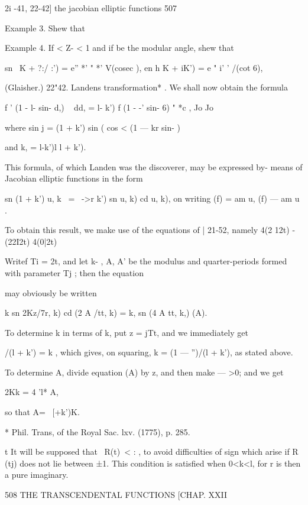 2i -41, 22-42] the jacobian elliptic functions 507 

Example 3. Shew that 

Example 4. If < Z- < 1 and if   be the modular angle, shew that 

sn \  K + ?:/ :') = e'' *' " *'  V(cosec  ), en h  K + iK') = e " i' '  /(cot 6), 

(Glaisher.) 
22"42. Landens transformation* . 
We shall now obtain the formula 

f ' (1 -  l- sin- d,) ~ dd, =  l-  k') f (1 -  -'  sin- 6) " *c , 
Jo Jo 

where sin  j = (1 + k') sin (  cos <  (1 — kr sin-  ) ~   

and k, =  l-k')l l + k'). 

This formula, of which Landen was the discoverer, may be expressed by- 
means of Jacobian elliptic functions in the form 

sn  (1 + k') u, k \ =  \ ->r k') sn  u, k) cd  u, k), 
on writing (f) = am u, (f)  — am u  . 

To obtain this result, we make use of the equations of | 21-52, namely 
 4(2 12t) -  (22I2t)  4(0|2t) 

Writef Ti = 2t, and let k- , A, A' be the modulus and quarter-periods 
formed with parameter Tj ; then the equation 


may obviously be written 

k sn  2Kz/7r, k) cd (2 A /tt, k) = k,  sn (4 A  tt, k,) (A). 

To determine k  in terms of k, put z = jTt, and we immediately get 

  /(l + k') = k , 
which gives, on squaring, k  = (1 —  '')/(l + k'), as stated above. 

To determine A, divide equation (A) by z, and then make  — >0; and 
we get 

2Kk = 4 'l* A, 

so that A=~ [+k')K. 

* Phil. Trans, of the Royal Sac. lxv. (1775), p. 285. 

t It will be supposed that \ R(t)\ < : , to avoid difficulties of sign which arise if R (tj) does 
not lie between ±1. This condition is satisfied when 0<k<l, for r is then a pure imaginary. 



508 THE TRANSCENDENTAL FUNCTIONS [CHAP. XXII 

